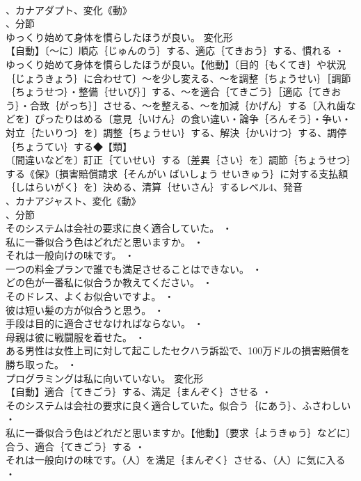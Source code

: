 \documentclass[8pt]{extreport}
\begin{document}
\begin{CJK}{UTF8}{min}
\\	、カナアダプト、変化《動》
\\	、分節
\\	ゆっくり始めて身体を慣らしたほうが良い。	変化形 
\\	【自動】〔～に〕順応｛じゅんのう｝する、適応｛てきおう｝する、慣れる ・
\\	ゆっくり始めて身体を慣らしたほうが良い。【他動】〔目的｛もくてき｝や状況｛じょうきょう｝に合わせて〕～を少し変える、～を調整｛ちょうせい｝［調節｛ちょうせつ｝・整備｛せいび｝］する、～を適合｛てきごう｝［適応｛てきおう｝・合致｛がっち｝］させる、～を整える、～を加減｛かげん｝する〔入れ歯などを〕ぴったりはめる〔意見｛いけん｝の食い違い・論争｛ろんそう｝・争い・対立｛たいりつ｝を〕調整｛ちょうせい｝する、解決｛かいけつ｝する、調停｛ちょうてい｝する◆【類】
\\	〔間違いなどを〕訂正｛ていせい｝する〔差異｛さい｝を〕調節｛ちょうせつ｝する《保》〔損害賠償請求｛そんがい ばいしょう せいきゅう｝に対する支払額｛しはらいがく｝を〕決める、清算｛せいさん｝するレベル4、発音
\\	、カナアジャスト、変化《動》
\\	、分節
\\	そのシステムは会社の要求に良く適合していた。 ・
\\	私に一番似合う色はどれだと思いますか。 ・
\\	それは一般向けの味です。 ・
\\	一つの料金プランで誰でも満足させることはできない。 ・
\\	どの色が一番私に似合うか教えてください。 ・
\\	そのドレス、よくお似合いですよ。 ・
\\	彼は短い髪の方が似合うと思う。 ・
\\	手段は目的に適合させなければならない。 ・
\\	母親は彼に戦闘服を着せた。 ・
\\	ある男性は女性上司に対して起こしたセクハラ訴訟で、100万ドルの損害賠償を勝ち取った。 ・
\\	プログラミングは私に向いていない。	変化形 
\\	【自動】適合｛てきごう｝する、満足｛まんぞく｝させる ・
\\	そのシステムは会社の要求に良く適合していた。似合う｛にあう｝、ふさわしい ・
\\	私に一番似合う色はどれだと思いますか。【他動】〔要求｛ようきゅう｝などに〕合う、適合｛てきごう｝する ・
\\	それは一般向けの味です。（人）を満足｛まんぞく｝させる、（人）に気に入る ・

\end{CJK}
\end{document}

